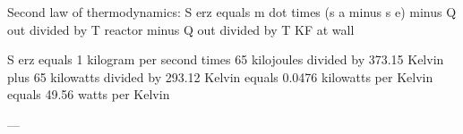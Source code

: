 Second law of thermodynamics:  
S erz equals m dot times (s a minus s e) minus Q out divided by T reactor minus Q out divided by T KF at wall  

S erz equals 1 kilogram per second times 65 kilojoules divided by 373.15 Kelvin plus 65 kilowatts divided by 293.12 Kelvin equals 0.0476 kilowatts per Kelvin equals 49.56 watts per Kelvin  

---
